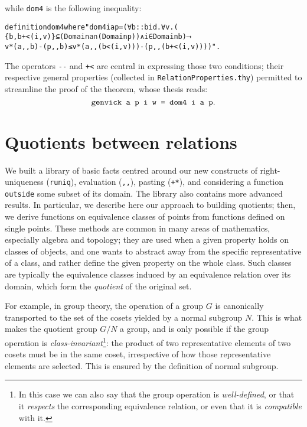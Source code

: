 \documentclass[
]{llncs}
\newenvironment{mytable}{
\vspace{0.2ex}
\begin{center}\begin{minipage}
{0.9\textwidth}\renewcommand{\baselinestretch}{0.75}\begin{small}}
{\end{small}\end{minipage}\end{center}
\vspace{0.1ex}
}
\begin{document}
\noindent while \verb|dom4| is the following inequality:

\begin{mytable}
\begin{alltt}
definition dom4 where "dom4 i a p = (∀ b::bid. ∀ v.(
\{b,b+<(i,v)\}⊆(Domain a ∩ (Domain p)) ∧ i∈Domain b)⟶ 
v*(a,,b)-(p,,b) ≤ v*(a,,(b<(i,v)))-(p,,(b+<(i,v))))".
\end{alltt}
\end{mytable}

The operators \verb|--| and \verb|+<| are central in expressing those two conditions; 
their respective general properties (collected in \verb|RelationProperties.thy|) permitted to streamline the proof of the theorem, whose thesis reads:
\begin{equation}
\label{RefMaskin2Thesis}
\verb|genvick a p i w = dom4 i a p|.
\end{equation}











\section{Quotients between relations}
\label{RefQuotients}
We built a library of basic facts centred around our new constructs of right-uniqueness (\verb|runiq|), evaluation (\verb|,,|), pasting (\verb|+*|), 
and considering a function \verb|outside| some subset of its domain.
The library also contains more advanced results.
In particular, we describe here our approach to building quotients; then, we derive functions on equivalence classes of points from functions defined on single points.
These methods are common in many areas of mathematics, especially algebra and topology; they are used when a given property holds on classes of objects, and one wants to abstract away from the specific representative of a class, and rather define the given property on the whole class. 
Such classes are typically the equivalence classes induced by an equivalence relation over its domain, which form the \emph{quotient} of the original set.

For example, in group theory, the operation of a group $G$ is canonically transported to the set of the cosets yielded by a normal subgroup $N$. 
This is what makes the quotient group $G/N$ a group, and is only possible if the group operation is \emph{class-invariant}\footnote{In this case we can also say that the group operation is \emph{well-defined}, or that it \emph{respects} the corresponding equivalence relation, or even that it is \emph{compatible} with it.}: 
the product of two representative elements of two cosets must be in the same coset, irrespective of how those representative elements are selected. 
This is ensured by the definition of normal subgroup.
\end{document}
